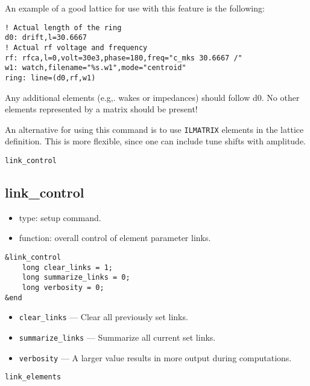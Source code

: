 \documentclass[11pt]{article}
\begin{document}
An example of a good lattice for use with this feature is the following:
\begin{verbatim}
! Actual length of the ring
d0: drift,l=30.6667
! Actual rf voltage and frequency
rf: rfca,l=0,volt=30e3,phase=180,freq="c_mks 30.6667 /"
w1: watch,filename="%s.w1",mode="centroid"
ring: line=(d0,rf,w1)
\end{verbatim}
Any additional elements (e.g,. wakes or impedances) should follow d0.  No other elements represented by a matrix
should be present!

An alternative for using this command is to use {\tt ILMATRIX} elements in the lattice definition.  This is more
flexible, since one can include tune shifts with amplitude.

\begin{latexonly}
\newpage
\begin{center}{\Large\verb|link_control|}\end{center}
\end{latexonly}
\subsection{link\_control \label{subsec:linkcontrol}}

\begin{itemize}
\item type: setup command.
\item function: overall control of element parameter links.
\end{itemize}

\begin{verbatim}
&link_control
    long clear_links = 1;
    long summarize_links = 0;
    long verbosity = 0;
&end
\end{verbatim}

\begin{itemize}
\item \verb|clear_links| --- Clear all previously set links.
\item \verb|summarize_links| --- Summarize all current set links.
\item \verb|verbosity| --- A larger value results in more output
during computations.

\end{itemize}

\begin{latexonly}
\newpage
\begin{center}{\Large\verb|link_elements|}\end{center}
\end{latexonly}
\end{document}
